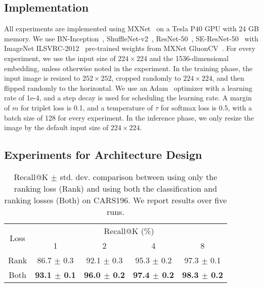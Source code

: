 \documentclass[10pt,twocolumn,letterpaper]{article}
\begin{document}
\begin{CJK}{UTF8}{mj}
\subsection{Implementation}

All experiments are implemented using MXNet~\cite{chen2015mxnet} on a Tesla P40 GPU with 24 GB memory.
We use BN-Inception~\cite{ioffe2015batch}, ShuffleNet-v2~\cite{ma2018shufflenet}, ResNet-50~\cite{he2016deep}, SE-ResNet-50~\cite{hu2018squeeze} with ImageNet ILSVRC-2012~\cite{deng2009imagenet} pre-trained weights from MXNet GluonCV~\cite{gluoncv}.
For every experiment, we use the input size of $224 \times 224$ and the 1536-dimensional embedding, unless otherwise noted in the experiment.
In the training phase, the input image is resized to $252 \times 252$, cropped randomly to $224 \times 224$, and then flipped randomly to the horizontal.
We use an Adam~\cite{kingma2014adam} optimizer with a learning rate of 1e-4, and a step decay is used for scheduling the learning rate.
A margin of $m$ for triplet loss is 0.1, and a temperature of $\tau$ for softmax loss is 0.5, with a batch size of 128 for every experiment.
In the inference phase, we only resize the image by the default input size of $224 \times 224$.


\subsection{Experiments for Architecture Design}


\begin{table}[t!]
\begin{center}
\begin{adjustbox}{width=.95\columnwidth,center}
\begin{tabular}{c|cccc}
\hline
\multirow{2}{*}{Loss} & \multicolumn{4}{c}{Recall@K (\%)}                \\ \cline{2-5} 
                       & 1          & 2          & 4          & 8          \\ \hline\hline
Rank                   & 86.7 $\pm$ 0.3 & 92.1 $\pm$ 0.3 & 95.3 $\pm$ 0.2 & 97.3 $\pm$ 0.1 \\
Both                   & \textbf{93.1 $\pm$ 0.1} & \textbf{96.0 $\pm$ 0.2} & \textbf{97.4 $\pm$ 0.2} & \textbf{98.3 $\pm$ 0.2} \\ \hline
\end{tabular}
\end{adjustbox}


\end{center}
\caption{Recall@K $\pm$ std. dev. comparison between using only the ranking loss (Rank) and using both the classification and ranking losses (Both) on CARS196.
We report results over five runs.}
\label{table:loss}
\end{table}


\end{CJK}
\end{document}
